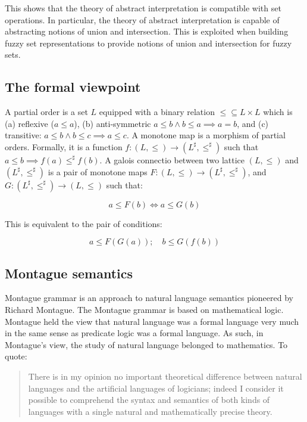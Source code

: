 \documentclass[11pt]{book}
\begin{document}
This shows that the theory of abstract interpretation is compatible with set
operations. In particular, the theory of abstract interpretation is capable of
abstracting notions of union and intersection. This is exploited when building
fuzzy set representations to provide notions of union and intersection for
fuzzy sets.

\subsection{The formal viewpoint}

A partial order is a set $L$ equipped with a binary relation $\leq \subseteq L
\times L$ which is (a) reflexive ($a \leq a$), (b) anti-symmetric $a \leq b
\land b \leq a \implies a = b$, and (c) transitive: $a \leq b \land b \leq c
\implies a \leq c$.  A monotone map is a morphism of partial orders. Formally,
it is a function $f: (L, \leq) \rightarrow (L^\sharp, \leq^\sharp)$ such that
$a \leq b \implies f(a) \leq^\sharp f(b)$.  A galois connectio between two
lattice $(L, \leq)$ and $(L^\sharp, \leq^\sharp)$ is a pair of monotone maps
$F: (L, \leq) \rightarrow (L^\sharp, \leq^\sharp)$, and
$G: (L^\sharp, \leq^\sharp) \rightarrow  (L, \leq)$ such that:

$$
a \leq F(b) \iff a \leq G(b)
$$

This is equivalent to the pair of conditions:

$$
a \leq F(G(a)); \quad b \leq G(f(b))
$$


\subsection{Montague semantics}

Montague grammar is an approach to natural language semantics pioneered by
Richard Montague. The Montague grammar is based on mathematical logic.
Montague held the view that natural language was a formal language very much in
the same sense as predicate logic was a formal language. As such, in Montague’s
view, the study of natural language belonged to mathematics. To quote:


\begin{quote}
There is in my opinion no important theoretical difference between natural
languages and the artificial languages of logicians; indeed I consider it
possible to comprehend the syntax and semantics of both kinds of languages
with a single natural and mathematically precise theory.
\end{quote}
\end{document}
